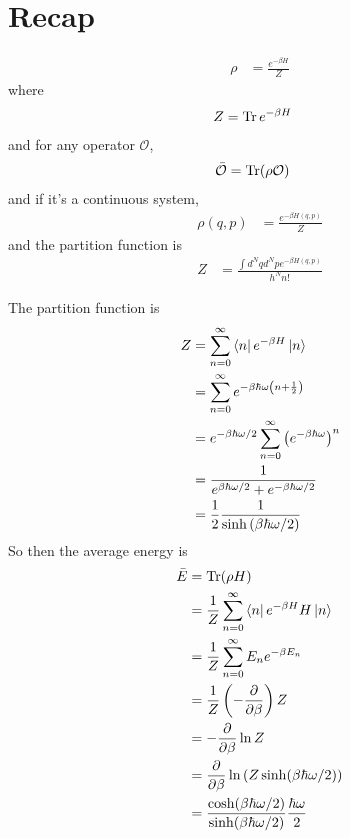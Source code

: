 \section{Recap}
\begin{align}
    \rho &= \frac{e^{-\beta H}}{Z}
\end{align}
where
\begin{align}
    Z &= \Tr e^{-\beta H}
\end{align}
and for any operator $\mathcal{O}$,
\begin{align}
    \bar{\mathcal{O}} &= \Tr(\rho\mathcal{O})
\end{align}
and if it's a continuous system,
\begin{align}
    \rho(q, p) &=
    \frac{e^{-\beta H(q, p)}}{Z}
\end{align}
and the partition function is
\begin{align}
    Z &=
    \frac{\int d^Nq d^Np e^{-\beta H(q, p)}}{h^N n!}
\end{align}

\begin{example}
    The partition function is
    \begin{align}
        Z &=
        \sum_{n=0}^{\infty} \bra{n} e^{-\beta H} \ket{n}\\
        &=
        \sum_{n=0}^{\infty} e^{-\beta\hbar\omega\left( n + \frac{1}{2}
        \right)}\\
        &=
        e^{-\beta \hbar\omega/2}
        \sum_{n=0}^{\infty} \left( e^{-\beta \hbar \omega} \right)^n\\
        &=
        \frac{1}{e^{\beta \hbar\omega/2} + e^{-\beta\hbar\omega/2}}\\
        &=
        \frac{1}{2}
        \frac{1}{\sinh\left(\beta\hbar\omega/2 \right)}
    \end{align}
    So then the average energy is
    \begin{align}
        \bar{E} &= \Tr(\rho H)\\
        &= \frac{1}{Z} \sum_{n=0}^{\infty}
        \bra{n} e^{-\beta H} H \ket{n}\\
        &=
        \frac{1}{Z} \sum_{n=0}^{\infty}
        E_n e^{-\beta E_n}\\
        &= \frac{1}{Z}\left( -\frac{\partial}{\partial\beta} \right) Z\\
        &=
        -\frac{\partial}{\partial\beta}\ln Z\\
        &=
        \frac{\partial}{\partial\beta}
        \ln\left( 
            Z \sinh(\beta\hbar\omega/2)
        \right)\\
        &=
        \frac{\cosh(\beta\hbar\omega/2)}{\sinh(\beta\hbar\omega/2)}
        \frac{\hbar\omega}{2}
    \end{align}
\end{example}

